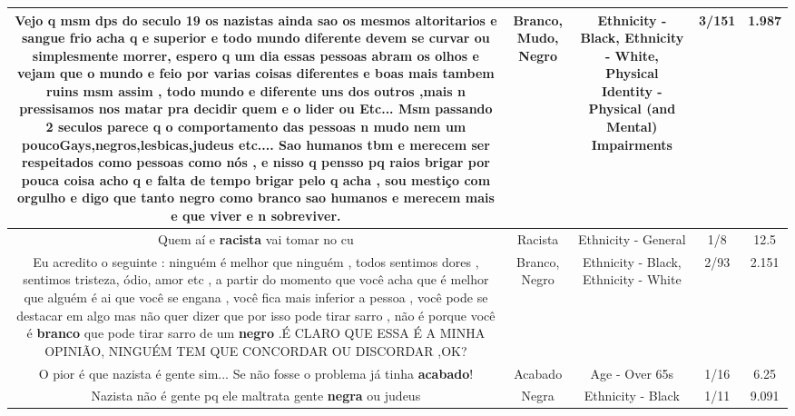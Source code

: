 \documentclass[11pt]{article}
\newlength\mylength
\begin{document}
\begin{center}
\begin{longtable}{|C{.65\mylength}|C{.30\mylength}|C{.12\mylength}|C{.12\mylength}|C{.12\mylength}|}
  \small Vejo q msm dps do seculo 19 os nazistas ainda sao os mesmos altoritarios e sangue frio acha q e superior e todo mundo diferente devem se curvar ou simplesmente morrer, espero q um dia essas pessoas abram os olhos e vejam que o mundo e feio por varias coisas diferentes e boas mais tambem ruins msm assim , todo mundo e diferente uns dos outros ,mais n pressisamos nos matar pra decidir quem e o lider ou Etc...   Msm passando 2 seculos parece q o comportamento das pessoas n \textbf{mudo} nem um poucoGays,negros,lesbicas,judeus etc.... Sao humanos tbm e merecem ser respeitados como pessoas como nós  , e nisso q pensso pq raios brigar por pouca coisa  acho q e falta de tempo  brigar pelo q acha  , sou mestiço com orgulho  e digo que tanto \textbf{negro} como \textbf{branco} sao humanos e merecem mais e que viver e n sobreviver.\normalsize   & Branco, Mudo, Negro & Ethnicity - Black, Ethnicity - White, Physical Identity - Physical (and Mental) Impairments & 3/151 & 1.987 \\  \hline
  \small Quem aí e \textbf{racista} vai tomar no cu\normalsize   & Racista & Ethnicity - General & 1/8 & 12.5 \\  \hline
  \small Eu acredito o seguinte : ninguém é melhor que ninguém  , todos sentimos dores , sentimos tristeza,  ódio,  amor etc , a partir do momento que você acha que é melhor que alguém é ai que você se engana , você fica mais inferior a pessoa , você pode se destacar em algo mas não quer dizer que por isso pode tirar sarro , não é porque você é \textbf{branco} que pode tirar sarro de um \textbf{negro} .É CLARO QUE ESSA É A MINHA OPINIÃO,  NINGUÉM TEM QUE CONCORDAR OU DISCORDAR ,OK?\normalsize   & Branco, Negro & Ethnicity - Black, Ethnicity - White & 2/93 & 2.151 \\  \hline
  \small O pior é que nazista é gente sim... Se não fosse o problema já tinha \textbf{acabado}!\normalsize   & Acabado & Age - Over 65s & 1/16 & 6.25 \\  \hline
  \small Nazista não é gente pq ele maltrata gente \textbf{negra} ou judeus\normalsize   & Negra & Ethnicity - Black & 1/11 & 9.091 \\  \hline

\end{longtable}
\end{center}
\end{document}
